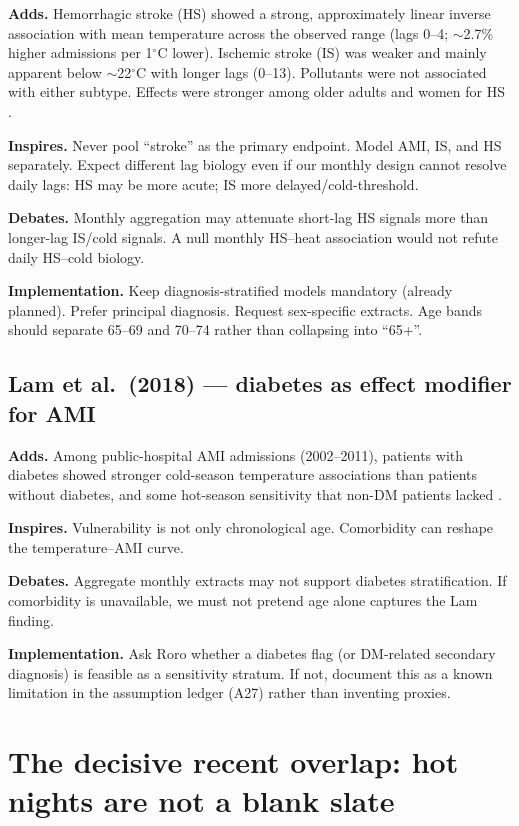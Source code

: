 \documentclass[11pt]{article}
\newcommand{\adds}{\textcolor{green!40!black}{\textbf{Adds.}}}
\newcommand{\inspires}{\textcolor{blue!55!black}{\textbf{Inspires.}}}
\newcommand{\debates}{\textcolor{orange!70!black}{\textbf{Debates.}}}
\newcommand{\impl}{\textcolor{purple!55!black}{\textbf{Implementation.}}}
\begin{document}
\adds{} Hemorrhagic stroke (HS) showed a strong, approximately linear inverse
association with mean temperature across the observed range (lags 0--4;
$\sim$2.7\% higher admissions per 1$^\circ$C lower). Ischemic stroke (IS) was weaker
and mainly apparent below $\sim$22$^\circ$C with longer lags (0--13). Pollutants were
not associated with either subtype. Effects were stronger among older adults and
women for HS \citep{goggins2012stroke}.

\inspires{} Never pool ``stroke'' as the primary endpoint. Model AMI, IS, and HS
separately. Expect different lag biology even if our monthly design cannot resolve
daily lags: HS may be more acute; IS more delayed/cold-threshold.

\debates{} Monthly aggregation may attenuate short-lag HS signals more than
longer-lag IS/cold signals. A null monthly HS--heat association would not refute
daily HS--cold biology.

\impl{} Keep diagnosis-stratified models mandatory (already planned). Prefer
principal diagnosis. Request sex-specific extracts. Age bands should separate
65--69 and 70--74 rather than collapsing into ``65+''.

\subsection{Lam et al.\ (2018) --- diabetes as effect modifier for AMI}

\adds{} Among public-hospital AMI admissions (2002--2011), patients with diabetes
showed stronger cold-season temperature associations than patients without
diabetes, and some hot-season sensitivity that non-DM patients lacked
\citep{lam2018amiDiabetes}.

\inspires{} Vulnerability is not only chronological age. Comorbidity can reshape
the temperature--AMI curve.

\debates{} Aggregate monthly extracts may not support diabetes stratification.
If comorbidity is unavailable, we must not pretend age alone captures the Lam
finding.

\impl{} Ask Roro whether a diabetes flag (or DM-related secondary diagnosis) is
feasible as a sensitivity stratum. If not, document this as a known limitation in
the assumption ledger (A27) rather than inventing proxies.

\section{The decisive recent overlap: hot nights are not a blank slate}
\end{document}

